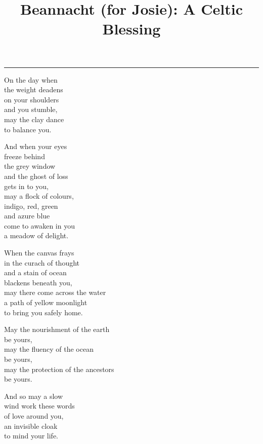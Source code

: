 \documentclass[12pt]{article} %
\title{Beannacht (for Josie): A Celtic Blessing}
\makeatletter
\renewcommand{\maketitle}{%
  \begin{center}
    {\bfseries{\scshape{\Large{\@title\par}}}}
  \end{center}
  \medskip
    \bigskip\hrule\vspace*{2pc}%
}
\makeatother
\begin{document}
  \maketitle

\begin{center} 

On the day when\\
the weight deadens\\
on your shoulders\\
and you stumble,\\
may the clay dance\\
to balance you.

And when your eyes\\
freeze behind\\
the grey window\\
and the ghost of loss\\
gets in to you,\\
may a flock of colours,\\
indigo, red, green\\
and azure blue\\
come to awaken in you\\
a meadow of delight.

When the canvas frays\\
in the curach of thought\\
and a stain of ocean\\
blackens beneath you,\\
may there come across the water\\
a path of yellow moonlight\\
to bring you safely home.

May the nourishment of the earth\\
be yours,\\
may the fluency of the ocean\\
be yours,\\
may the protection of the ancestors\\
be yours.

And so may a slow\\
wind work these words\\
of love around you,\\
an invisible cloak\\
to mind your life.
\end{center} 
\end{document}
